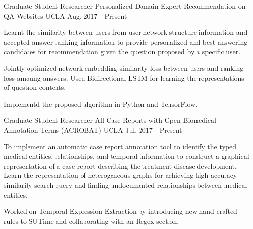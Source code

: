 \begin{cventries}
  \cventry
    {Graduate Student Researcher}
    {Personalized Domain Expert Recommendation on QA Websites}
    {UCLA}
    {Aug. 2017 - Present}
    {
    	\begin{cvitems}
    		\item {Learnt the similarity between users from user network structure information and accepted-answer ranking information to provide personalized and best answering candidates for recommendation given the question proposed by a specific user.}
    		\item {Jointly optimized network embedding similarity loss between users and ranking loss amoung answers. Used Bidirectional LSTM for learning the representations of question contents.}
    		\item {Implementd the proposed algorithm in Python and TensorFlow.}
    	\end{cvitems}
    }

\vspace{-1em}

  \cventry
    {Graduate Student Researcher}
    {All Case Reports with Open Biomedical Annotation Terms (ACROBAT)}
    {UCLA}
    {Jul. 2017 - Present}
    {
    	\begin{cvitems}
			\item {To implement an automatic case report annotation tool to identify the typed  medical entities, relationships, and temporal information to construct a graphical representation of a case report describing the treatment-disease development. Learn the representation of heterogeneous graphs for achieving high accuracy similarity search query and finding undocumented relationships between medical entities.}
			\item {Worked on Temporal Expression Extraction by introducing new hand-crafted rules to SUTime and collaborating with an Regex section.}
    	\end{cvitems}
    }

\vspace{-1.2em}


\end{cventries}
